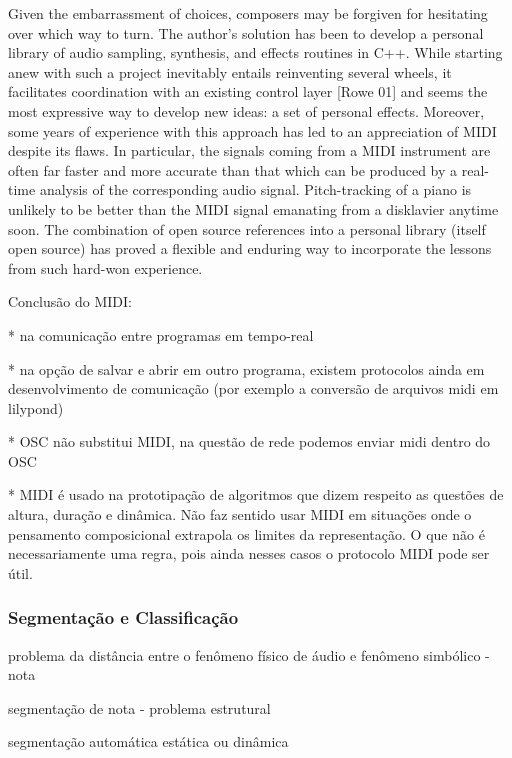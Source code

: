 \documentclass{ppgmus}
\begin{document}
Given the embarrassment of choices,
composers may be forgiven for hesitating over
which way to turn. The author's solution has
been to develop a personal library of audio
sampling, synthesis, and effects routines in C++.
While starting anew with such a project
inevitably entails reinventing several wheels, it
facilitates coordination with an existing control
layer [Rowe 01] and seems the most expressive
way to develop new ideas: a set of personal
effects.
Moreover, some years of experience
with this approach has led to an appreciation of
MIDI despite its flaws. In particular, the signals
coming from a MIDI instrument are often far
faster and more accurate than that which can be
produced by a real-time analysis of the
corresponding audio signal. Pitch-tracking of a
piano is unlikely to be better than the MIDI
signal emanating from a disklavier anytime
soon. The combination of open source references
into a personal library (itself open source) has
proved a flexible and enduring way to
incorporate the lessons from such hard-won
experience.






Conclusão do MIDI:

* na comunicação entre programas em tempo-real

* na opção de salvar e abrir em outro programa, existem protocolos ainda em
desenvolvimento de comunicação (por exemplo a conversão de arquivos midi em lilypond)

* OSC não substitui MIDI, na questão de rede podemos enviar midi dentro do OSC

* MIDI é usado na prototipação de algoritmos que dizem respeito as questões de 
altura, duração e dinâmica. Não faz sentido usar MIDI em situações onde o 
pensamento composicional extrapola os limites da representação. O que não é
necessariamente uma regra, pois ainda nesses casos o protocolo MIDI pode ser
útil.






\subsubsection{Segmentação e Classificação}

problema da distância entre o fenômeno físico de áudio e fenômeno
simbólico - nota

segmentação de nota - problema estrutural

segmentação automática estática ou dinâmica
\end{document}
